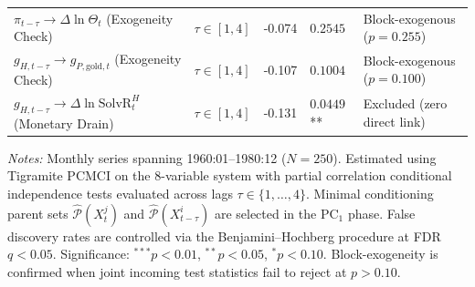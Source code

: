 \begin{table}[htbp]
\begin{tabularx}{\textwidth}{>{\RaggedRight}p{4.5cm}cc>{\RaggedRight}p{2.0cm}>{\RaggedRight}X}
$\pi_{t-\tau} \to \Delta \ln \Theta_t$ (Exogeneity Check) & $\tau \in [1,4]$ & -0.074 & $0.2545$ & Block-exogenous ($p = 0.255$) \\
$g_{H,t-\tau} \to g_{P,\text{gold}, t}$ (Exogeneity Check) & $\tau \in [1,4]$ & -0.107 & $0.1004$ & Block-exogenous ($p = 0.100$) \\
$g_{H,t-\tau} \to \Delta \ln \text{SolvR}^H_t$ (Monetary Drain) & $\tau \in [1,4]$ & -0.131 & $0.0449$** & Excluded (zero direct link) \\
\bottomrule
\end{tabularx}
\begin{minipage}{\textwidth}
\vspace{0.3em}
\footnotesize \textit{Notes:} Monthly series spanning 1960:01--1980:12 ($N=250$). Estimated using Tigramite PCMCI \citep{Runge2019} on the 8-variable system with partial correlation conditional independence tests evaluated across lags $\tau \in \{1, \dots, 4\}$. Minimal conditioning parent sets $\widehat{\mathcal{P}}(X^j_t)$ and $\widehat{\mathcal{P}}(X^i_{t-\tau})$ are selected in the PC$_1$ phase. False discovery rates are controlled via the Benjamini--Hochberg procedure at FDR $q < 0.05$. Significance: $^{***} p < 0.01$, $^{**} p < 0.05$, $^{*} p < 0.10$. Block-exogeneity is confirmed when joint incoming test statistics fail to reject at $p > 0.10$.
\end{minipage}
\end{table}